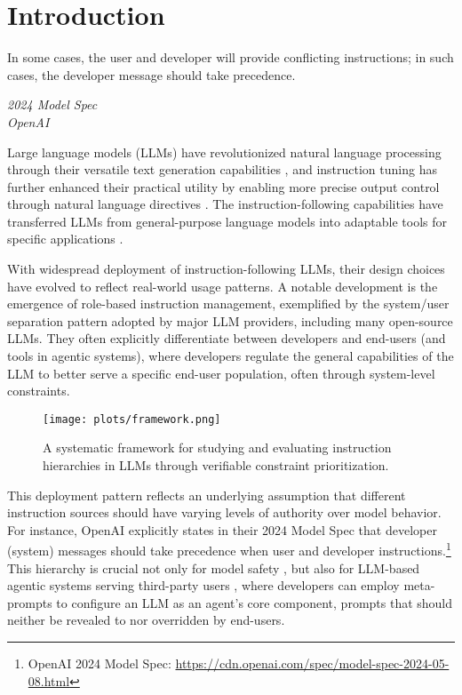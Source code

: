 \section{Introduction}


\epigraph{In some cases, the user and developer will provide conflicting instructions; in such cases, the developer message should take precedence.}{\textit{2024 Model Spec \\ OpenAI}}

Large language models (LLMs) have revolutionized natural language processing through their versatile text generation capabilities \citep{brown2020language,touvron2023llama,achiam2023gpt}, and instruction tuning has further enhanced their practical utility by enabling more precise output control through natural language directives \citep{Wei2021FinetunedLM, mishra-etal-2022-cross, wang-etal-2023-self-instruct, wu-etal-2024-language}. The instruction-following capabilities have transferred LLMs from general-purpose language models into adaptable tools for specific applications  \citep{wang-etal-2022-super, zhou2023instruction}.

With widespread deployment of instruction-following LLMs, their design choices have evolved to reflect real-world usage patterns. A notable development is the emergence of role-based instruction management, exemplified by the system/user separation pattern adopted by major LLM providers, including many open-source LLMs. They often explicitly differentiate between developers and end-users (and tools in agentic systems), where developers regulate the general capabilities of the LLM to better serve a specific end-user population, often through system-level constraints. 

\begin{figure}[t]
    \centering
    \texttt{[image: plots/framework.png]}
    \caption{A systematic framework for studying and evaluating instruction hierarchies in LLMs through verifiable constraint prioritization.}
    \label{fig:framework}
\end{figure}

This deployment pattern reflects an underlying assumption that different instruction sources should have varying levels of authority over model behavior. For instance, OpenAI explicitly states in their 2024 Model Spec that developer (system) messages should take precedence when user and developer instructions.\footnote{OpenAI 2024 Model Spec: \url{https://cdn.openai.com/spec/model-spec-2024-05-08.html}} This hierarchy is crucial not only for model safety \cite{wallace2024instruction}, but also for LLM-based agentic systems serving third-party users \citep{AutoGPT}, where developers can employ meta-prompts to configure an LLM as an agent's core component, prompts that should neither be revealed to nor overridden by end-users.


